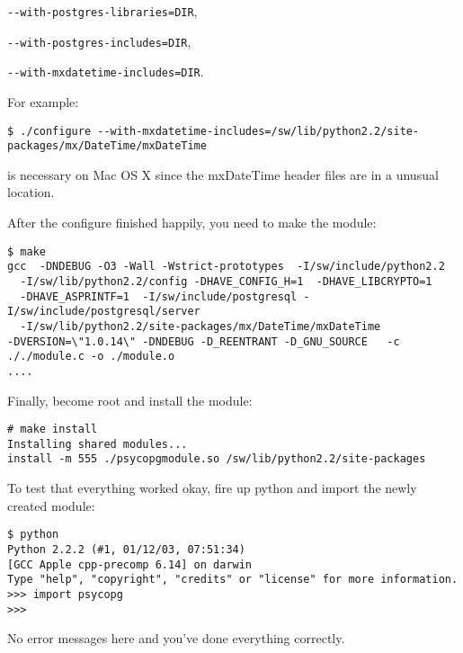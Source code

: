 \documentclass{article}
\begin{document}
\verb|--with-postgres-libraries=DIR|,

\verb|--with-postgres-includes=DIR|,

\verb|--with-mxdatetime-includes=DIR|. 

For example:

\begin{verbatim}
$ ./configure --with-mxdatetime-includes=/sw/lib/python2.2/site-packages/mx/DateTime/mxDateTime
\end{verbatim}

is necessary on Mac OS X since the mxDateTime header files are in a
unusual location.

After the configure finished happily, you need to make the module:

\begin{verbatim}
$ make
gcc  -DNDEBUG -O3 -Wall -Wstrict-prototypes  -I/sw/include/python2.2
  -I/sw/lib/python2.2/config -DHAVE_CONFIG_H=1  -DHAVE_LIBCRYPTO=1
  -DHAVE_ASPRINTF=1  -I/sw/include/postgresql -I/sw/include/postgresql/server
  -I/sw/lib/python2.2/site-packages/mx/DateTime/mxDateTime
-DVERSION=\"1.0.14\" -DNDEBUG -D_REENTRANT -D_GNU_SOURCE   -c
././module.c -o ./module.o
....
\end{verbatim}

Finally, become root and install the module:

\begin{verbatim}
# make install
Installing shared modules...
install -m 555 ./psycopgmodule.so /sw/lib/python2.2/site-packages
\end{verbatim}

To test that everything worked okay, fire up python and import the newly
created module:

\begin{verbatim}
$ python
Python 2.2.2 (#1, 01/12/03, 07:51:34) 
[GCC Apple cpp-precomp 6.14] on darwin
Type "help", "copyright", "credits" or "license" for more information.
>>> import psycopg
>>> 
\end{verbatim}

No error messages here and you've done everything correctly.
\\
\end{document}
